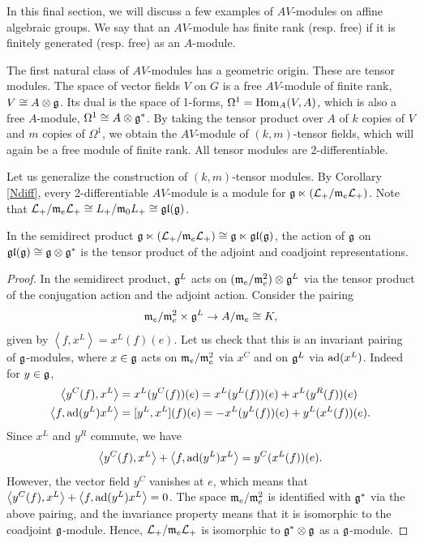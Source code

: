 \documentclass[12pt]{amsart}
\begin{document}
In this final section, we will discuss a few examples of $AV$-modules on affine algebraic groups. We say that an $AV$-module has finite rank (resp. free) if it is finitely generated (resp. free) as an $A$-module. 

The first natural class of $AV$-modules has a geometric origin. These are tensor modules. The space of vector fields $V$ on $G$ is a free $AV$-module of finite rank, $V \cong A \otimes \mathfrak{g}$. Its dual is the space of 1-forms,
$\Omega^1 = \textup{Hom}_A (V, A)$, which is also a free $A$-module, $\Omega^1 \cong A \otimes \mathfrak{g}^*$. 
By taking the tensor product over $A$ of $k$ copies of $V$ and $m$ copies of $\Omega^1$, we obtain the $AV$-module of $(k,m)$-tensor fields, which will again be a free module of finite rank. All tensor modules are 2-differentiable.

Let us generalize the construction of $(k, m)$-tensor modules. By Corollary \ref{Ndiff}, every 2-differentiable $AV$-module is a module for $\mathfrak{g} \ltimes ({\mathcal L}_+/\mathfrak{m}_e {\mathcal L}_+)$. Note that ${\mathcal L}_+/\mathfrak{m}_e {\mathcal L}_+ \cong L_+ / \mathfrak{m}_0 L_+ \cong \mathfrak{gl}(\mathfrak{g})$.

\begin{proposition}
In the semidirect product $\mathfrak{g} \ltimes ({\mathcal L}_+/\mathfrak{m}_e {\mathcal L}_+) \cong \mathfrak{g} \ltimes \mathfrak{gl}(\mathfrak{g})$, the action of $\mathfrak{g}$ on 
$\mathfrak{gl}(\mathfrak{g}) \cong \mathfrak{g} \otimes \mathfrak{g}^*$ is the tensor product of the adjoint and coadjoint representations. 
\end{proposition}
\begin{proof}
In the semidirect product, $\mathfrak{g}^L$ acts on $(\mathfrak{m}_e /\mathfrak{m}_e^2) \otimes \mathfrak{g}^L$ via the tensor product of the conjugation action and the adjoint action. Consider the pairing
$$\mathfrak{m}_e / \mathfrak{m}_e^2 \times \mathfrak{g}^L \rightarrow A /\mathfrak{m}_e \cong K,$$
given by $\left<f, x^L\right> = x^L(f)(e)$. Let us check that this is an invariant pairing of $\mathfrak{g}$-modules, where $x \in \mathfrak{g}$ acts on  $\mathfrak{m}_e / \mathfrak{m}_e^2$ via $x^C$ and on $\mathfrak{g}^L$ via $\textup{ad}(x^L)$. Indeed for $y \in \mathfrak{g}$,
\begin{align*}
\left<y^C (f), x^L\right> &= x^L (y^C (f))(e) = x^L (y^L (f))(e) + x^L (y^R(f))(e) \\
\left<f, \textup{ad}(y^L) x^L\right> &= [y^L, x^L] (f)(e) =  - x^L (y^L (f))(e) +  y^L (x^L (f))(e).
\end{align*}
Since $x^L$ and $y^R$ commute, we have 
$$\left<y^C (f), x^L\right> + \left<f, \textup{ad}(y^L) x^L\right> = y^C (x^L(f))(e).$$
However, the vector field $y^C$ vanishes at $e$, which means that $\left<y^C (f), x^L\right> + \left<f, \textup{ad}(y^L) x^L\right> = 0$. The space $\mathfrak{m}_e /\mathfrak{m}_e^2$ is identified with $\mathfrak{g}^*$ via the above pairing, and the invariance property means that it is isomorphic to the coadjoint $\mathfrak{g}$-module. Hence, ${\mathcal L}_+/\mathfrak{m}_e {\mathcal L}_+$ is isomorphic to 
$\mathfrak{g}^* \otimes \mathfrak{g}$ as a $\mathfrak{g}$-module.
\end{proof}
\end{document}
